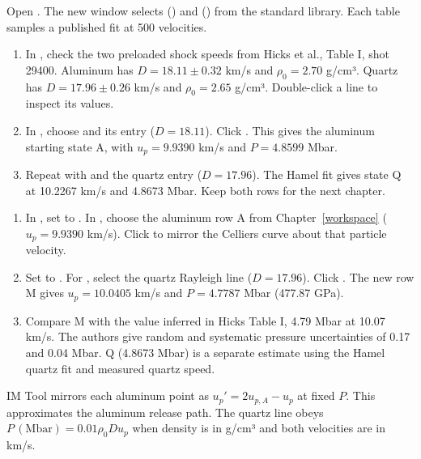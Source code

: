 Open . The new window selects  () and  () from the standard library. Each table samples a published fit at 500 velocities.
\begin{enumerate}
\item In , check the two preloaded shock speeds from Hicks et al., Table I, shot 29400. Aluminum has $D=18.11\pm0.32$ km/s and $\rho_0=2.70$ g/cm³. Quartz has $D=17.96\pm0.26$ km/s and $\rho_0=2.65$ g/cm³. Double-click a line to inspect its values.
\item In , choose  and its  entry ($D=18.11$). Click . This gives the aluminum starting state A, with $u_p=9.9390$ km/s and $P=4.8599$ Mbar.
\item Repeat with  and the quartz  entry ($D=17.96$). The Hamel fit gives state Q at 10.2267 km/s and 4.8673 Mbar. Keep both rows for the next chapter.
\end{enumerate}

\begin{enumerate}
\item In , set  to . In , choose the aluminum row A from Chapter~\ref{workspace} ($u_p=9.9390$ km/s). Click  to mirror the Celliers curve about that particle velocity.
\item Set  to . For , select the quartz Rayleigh line ($D=17.96$). Click . The new row M gives $u_p=10.0405$ km/s and $P=4.7787$ Mbar (477.87 GPa).
\item Compare M with the value inferred in Hicks Table I, 4.79 Mbar at 10.07 km/s. The authors give random and systematic pressure uncertainties of 0.17 and 0.04 Mbar. Q (4.8673 Mbar) is a separate estimate using the Hamel quartz fit and measured quartz speed.
\end{enumerate}
IM Tool mirrors each aluminum point as $u_p'=2u_{p,A}-u_p$ at fixed $P$. This approximates the aluminum release path. The quartz line obeys $P\,(\mathrm{Mbar})=0.01\rho_0 D u_p$ when density is in g/cm³ and both velocities are in km/s.

